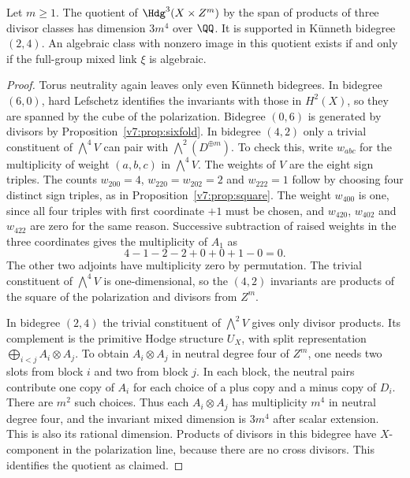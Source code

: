 \begin{proposition}\label{v7:prop:single-x-codim3}
Let $m\ge1$. The quotient of $\Hdg^3(X\times Z^m)$ by the span of
products of three divisor classes has dimension $3m^4$ over $\QQ$.
It is supported in K\"unneth bidegree $(2,4)$. An algebraic class with
nonzero image in this quotient exists if and only if the full-group
mixed link $\xi$ is algebraic.
\end{proposition}

\begin{proof}
Torus neutrality again leaves only even K\"unneth bidegrees. In bidegree
$(6,0)$, hard Lefschetz identifies the invariants with those in $H^2(X)$,
so they are spanned by the cube of the polarization. Bidegree $(0,6)$
is generated by divisors by Proposition~\ref{v7:prop:sixfold}.
In bidegree $(4,2)$ only a trivial constituent of $\bigwedge^4V$ can
pair with $\bigwedge^2(D^{\oplus m})$. To check this, write $w_{abc}$
for the multiplicity of weight $(a,b,c)$ in $\bigwedge^4V$.
The weights of $V$ are the eight sign triples. The counts
$w_{200}=4$, $w_{220}=w_{202}=2$ and $w_{222}=1$ follow by choosing
four distinct sign triples, as in Proposition~\ref{v7:prop:square}.
The weight $w_{400}$ is one, since all four triples with first
coordinate $+1$ must be chosen, and $w_{420}$, $w_{402}$ and $w_{422}$
are zero for the same reason. Successive subtraction of raised
weights in the three coordinates gives the multiplicity of $A_1$ as
\[
 4-1-2-2+0+0+1-0=0.
\]
The other two adjoints have multiplicity zero by permutation. The
trivial constituent of $\bigwedge^4V$ is one-dimensional, so the
$(4,2)$ invariants are products of the square of the polarization and
divisors from $Z^m$.

In bidegree $(2,4)$ the trivial constituent of $\bigwedge^2V$ gives
only divisor products. Its complement is the primitive Hodge structure
$U_X$, with split representation $\bigoplus_{i<j}A_i\otimes A_j$.
To obtain $A_i\otimes A_j$ in neutral degree four of $Z^m$, one needs
two slots from block $i$ and two from block $j$. In each block, the
neutral pairs contribute one copy of $A_i$ for each choice of a plus
copy and a minus copy of $D_i$. There are $m^2$ such choices. Thus
each $A_i\otimes A_j$ has multiplicity $m^4$ in neutral degree four,
and the invariant mixed dimension is $3m^4$ after scalar extension.
This is also its rational dimension. Products of divisors in this
bidegree have $X$-component in the polarization line, because there
are no cross divisors. This identifies the quotient as claimed.


\end{proof}
